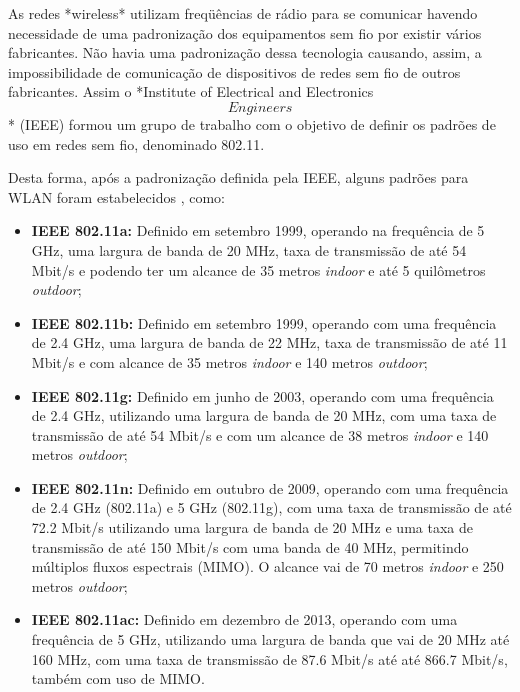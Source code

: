 \documentclass[
	12pt,				%
	twoside,			%
	a4paper,			%
	english,			%
	french,				%
	spanish,			%
	brazil				%
	]{abntex2}
\begin{document}
\begin{citacao}
    As redes *wireless* utilizam freqüências de rádio para se comunicar
    havendo necessidade de uma padronização dos equipamentos sem fio por
    existir vários fabricantes. Não havia uma padronização dessa tecnologia
    causando, assim, a impossibilidade de comunicação de dispositivos de
    redes sem fio de outros fabricantes. Assim o *Institute of Electrical
    and Electronics \[Engineers\]* (IEEE) formou um grupo de trabalho com o
    objetivo de definir os padrões de uso em redes sem fio, denominado
    802.11. 
\end{citacao}

Desta forma, após a padronização definida pela IEEE, alguns padrões para
WLAN foram estabelecidos \cite{RIVERA,BANERJI}, como:

\begin{itemize}
\item
  \textbf{IEEE 802.11a:} Definido em setembro 1999, operando na
  frequência de 5 GHz, uma largura de banda de 20 MHz, taxa de
  transmissão de até 54 Mbit/s e podendo ter um alcance de 35 metros
  \emph{indoor} e até 5 quilômetros \emph{outdoor};
\item
  \textbf{IEEE 802.11b:} Definido em setembro 1999, operando com uma
  frequência de 2.4 GHz, uma largura de banda de 22 MHz, taxa de
  transmissão de até 11 Mbit/s e com alcance de 35 metros \emph{indoor}
  e 140 metros \emph{outdoor};
\item
  \textbf{IEEE 802.11g:} Definido em junho de 2003, operando com uma
  frequência de 2.4 GHz, utilizando uma largura de banda de 20 MHz, com
  uma taxa de transmissão de até 54 Mbit/s e com um alcance de 38 metros
  \emph{indoor} e 140 metros \emph{outdoor};
\item
  \textbf{IEEE 802.11n:} Definido em outubro de 2009, operando com uma
  frequência de 2.4 GHz (802.11a) e 5 GHz (802.11g), com uma taxa de
  transmissão de até 72.2 Mbit/s utilizando uma largura de banda de 20
  MHz e uma taxa de transmissão de até 150 Mbit/s com uma banda de 40
  MHz, permitindo múltiplos fluxos espectrais (MIMO). O alcance vai de
  70 metros \emph{indoor} e 250 metros \emph{outdoor};
\item
  \textbf{IEEE 802.11ac:} Definido em dezembro de 2013, operando com uma
  frequência de 5 GHz, utilizando uma largura de banda que vai de 20 MHz
  até 160 MHz, com uma taxa de transmissão de 87.6 Mbit/s até até 866.7
  Mbit/s, também com uso de MIMO.
\end{itemize}
\end{document}
